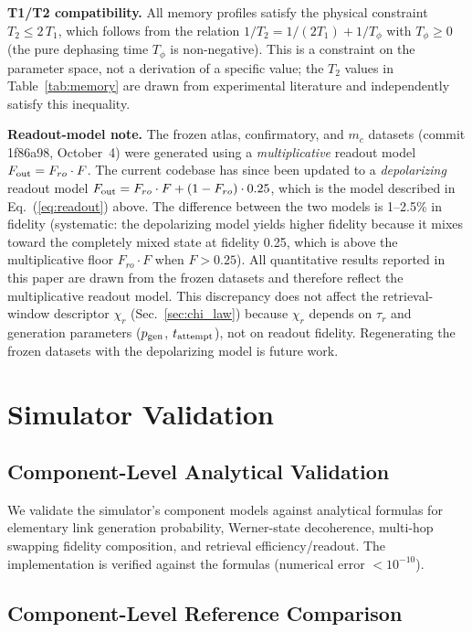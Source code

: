 \documentclass[quantumrep,article,submit,moreauthors]{Definitions/mdpi}
\begin{document}
\textbf{T1/T2 compatibility.} All memory profiles satisfy the physical constraint $T_2 \le 2\,T_1$, which follows from the relation $1/T_2 = 1/(2T_1) + 1/T_\phi$ with $T_\phi \ge 0$ (the pure dephasing time $T_\phi$ is non-negative). This is a constraint on the parameter space, not a derivation of a specific value; the $T_2$ values in Table~\ref{tab:memory} are drawn from experimental literature and independently satisfy this inequality.

\textbf{Readout-model note.} The frozen atlas, confirmatory, and $m_c$ datasets (commit 1f86a98, October~4) were generated using a \emph{multiplicative} readout model $F_{\rm out} = F_{ro} \cdot F$. The current codebase has since been updated to a \emph{depolarizing} readout model $F_{\rm out} = F_{ro} \cdot F + (1 - F_{ro}) \cdot 0.25$, which is the model described in Eq.~(\ref{eq:readout}) above. The difference between the two models is 1--2.5\% in fidelity (systematic: the depolarizing model yields higher fidelity because it mixes toward the completely mixed state at fidelity 0.25, which is above the multiplicative floor $F_{ro} \cdot F$ when $F > 0.25$). All quantitative results reported in this paper are drawn from the frozen datasets and therefore reflect the multiplicative readout model. This discrepancy does not affect the retrieval-window descriptor $\chi_r$ (Sec.~\ref{sec:chi_law}) because $\chi_r$ depends on $\tau_r$ and generation parameters ($p_{\rm gen}$, $t_{\rm attempt}$), not on readout fidelity. Regenerating the frozen datasets with the depolarizing model is future work.

\section{Simulator Validation}

\subsection{Component-Level Analytical Validation}

We validate the simulator's component models against analytical formulas for elementary link generation probability, Werner-state decoherence, multi-hop swapping fidelity composition, and retrieval efficiency/readout. The implementation is verified against the formulas (numerical error $< 10^{-10}$).

\subsection{Component-Level Reference Comparison}
\end{document}

